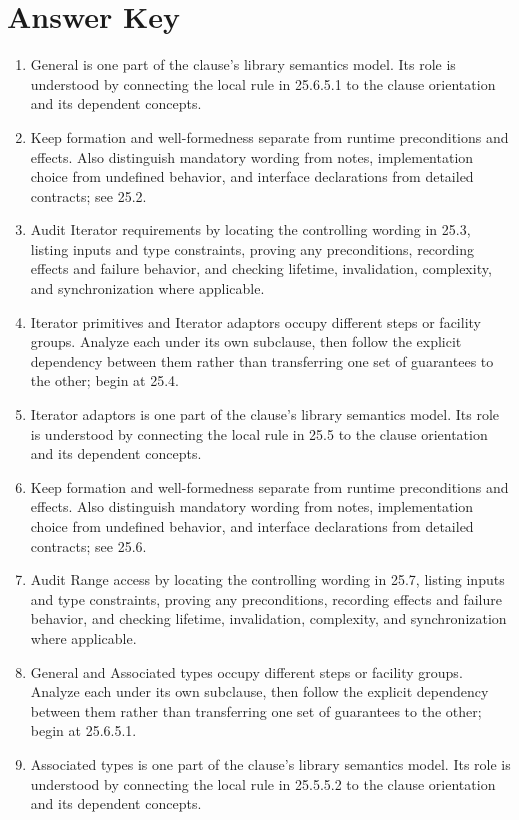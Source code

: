 \documentclass[11pt,letterpaper]{article}
\begin{document}
\clearpage\section{Answer Key}
\begin{enumerate}
\item General is one part of the clause's library semantics model. Its role is understood by connecting the local rule in 25.6.5.1 to the clause orientation and its dependent concepts.
\item Keep formation and well-formedness separate from runtime preconditions and effects. Also distinguish mandatory wording from notes, implementation choice from undefined behavior, and interface declarations from detailed contracts; see 25.2.
\item Audit Iterator requirements by locating the controlling wording in 25.3, listing inputs and type constraints, proving any preconditions, recording effects and failure behavior, and checking lifetime, invalidation, complexity, and synchronization where applicable.
\item Iterator primitives and Iterator adaptors occupy different steps or facility groups. Analyze each under its own subclause, then follow the explicit dependency between them rather than transferring one set of guarantees to the other; begin at 25.4.
\item Iterator adaptors is one part of the clause's library semantics model. Its role is understood by connecting the local rule in 25.5 to the clause orientation and its dependent concepts.
\item Keep formation and well-formedness separate from runtime preconditions and effects. Also distinguish mandatory wording from notes, implementation choice from undefined behavior, and interface declarations from detailed contracts; see 25.6.
\item Audit Range access by locating the controlling wording in 25.7, listing inputs and type constraints, proving any preconditions, recording effects and failure behavior, and checking lifetime, invalidation, complexity, and synchronization where applicable.
\item General and Associated types occupy different steps or facility groups. Analyze each under its own subclause, then follow the explicit dependency between them rather than transferring one set of guarantees to the other; begin at 25.6.5.1.
\item Associated types is one part of the clause's library semantics model. Its role is understood by connecting the local rule in 25.5.5.2 to the clause orientation and its dependent concepts.

\end{enumerate}
\end{document}
